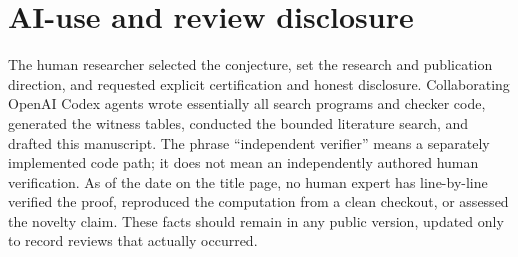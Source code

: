 \documentclass[11pt]{article}
\theoremstyle{definition}
\begin{document}
\section{AI-use and review disclosure}\label{sec:ai}

The human researcher selected the conjecture, set the research and publication
direction, and requested explicit certification and honest disclosure.
Collaborating OpenAI Codex agents wrote essentially all search programs and
checker code, generated the witness tables, conducted the bounded literature
search, and drafted this manuscript.  The phrase ``independent verifier''
means a separately implemented code path; it does not mean an independently
authored human verification.  As of the date on the title page, no human
expert has line-by-line verified the proof, reproduced the computation from a
clean checkout, or assessed the novelty claim.  These facts should remain in
any public version, updated only to record reviews that actually occurred.
\end{document}
